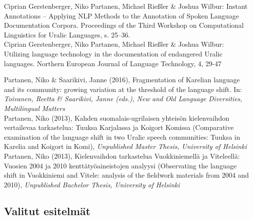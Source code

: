 \documentclass[11pt, a4paper]{article}
\newcommand{\years}[1]{\marginnote{\scriptsize #1}} %
\begin{document}
\years{2017} Ciprian Gerstenberger, Niko Partanen, Michael Rießler \& Joshua Wilbur: Instant Annotations -- Applying NLP Methods to the Annotation of Spoken Language Documentation Corpora. Proceedings of the Third Workshop on Computational Linguistics for Uralic Languages, s. 25--36.\\

\years{2016} Ciprian Gerstenberger, Niko Partanen, Michael Rießler \& Joshua Wilbur: Utilizing language technology in the documentation of endangered Uralic languages. Northern European Journal of Language Technology, 4, 29-47 \\

\pagebreak

\years{2016} Partanen, Niko \& Saarikivi, Janne (2016), Fragmentation of Karelian language and its community: growing variation at the threshold of the language shift. In: \emph{Toivanen, Reetta \& Saarikivi, Janne (eds.), New and Old Language Diversities, Multilingual Matters}\\


\years{2013}Partanen, Niko (2013), Kahden suomalais-ugrilaisen yhteisön kielenvaihdon vertailevaa tarkastelua: Tuuksa Karjalassa ja Koigort Komissa (Comparative examination of the language shift in two Uralic speech communities: Tuuksa in Karelia and Koigort in Komi), \emph{Unpublished Master Thesis, University of Helsinki}\\

\years{2013}Partanen, Niko (2013), Kielenvaihdon tarkastelua Vuokkiniemellä ja Viteleellä: Vuosien 2004 ja 2010 kenttätyöaineistojen analyysi (Observating the language shift in Vuokkiniemi and Vitele: analysis of the fieldwork materials from 2004 and 2010), \emph{Unpublished Bachelor Thesis, University of Helsinki}\\


\subsection*{Valitut esitelmät}
\end{document}
